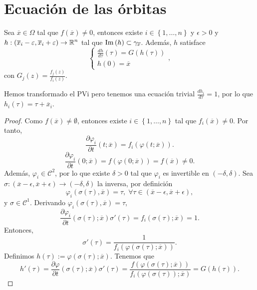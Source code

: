 \section{Ecuación de las órbitas}
\begin{theorem}
	Sea $\displaystyle \overline{x}\in \Omega  $ tal que $\displaystyle f\left(\overline{x}\right)\neq0 $, entonces existe $\displaystyle i \in \left\{ 1, \ldots, n\right\}  $ y $\displaystyle \epsilon > 0 $ y $\displaystyle h : \left(\overline{x}_{i}-\varepsilon, \overline{x}_{i}+\varepsilon \right)\to \mathbb{R}^{n} $ tal que $\displaystyle \operatorname{Im}\left(h\right)\subset \gamma_{\overline{x}} $. Además, $\displaystyle h $ satisface
	\[
	\begin{cases}
	\frac{dh}{d\tau}\left(\tau\right)=G\left(h\left(\tau\right)\right)\\
	h\left(0\right)=\overline{x}
	\end{cases}
	,\]
	con $\displaystyle G_{j}\left(z\right)=\frac{f_{j}\left(z\right)}{f_{i}\left(z\right)} $. 
\end{theorem}
\begin{observation}
Hemos transformado el PVi pero tenemos una ecuación trivial $\displaystyle \frac{dh_{i}}{d\tau }= 1 $, por lo que $\displaystyle h_{i}\left(\tau\right)=\tau + \overline{x}_{i} $. 
\end{observation}
\begin{proof}
	Como $\displaystyle f\left(\overline{x}\right)\neq \emptyset $, entonces existe $\displaystyle i \in \left\{ 1, \ldots, n\right\}  $ tal que $\displaystyle f_{i}\left(\overline{x}\right)\neq 0 $. Por tanto, 
	\[\frac{\partial \varphi_{i}}{\partial t}\left(t; \overline{x}\right)=f_{i}\left(\varphi\left(t; \overline{x}\right)\right) .\]
	\[\frac{\partial \varphi_{i}}{\partial t}\left(0; \overline{x}\right)=f\left(\varphi\left(0; \overline{x}\right)\right)=f\left(\overline{x}\right)\neq 0 .\]
	Además, $\displaystyle \varphi_{i}\in \mathcal{C}^{2} $, por lo que existe $\displaystyle \delta > 0 $ tal que $\displaystyle \varphi_{i} $ es invertible en $\displaystyle \left(-\delta, \delta \right) $. Sea $\displaystyle \sigma : \left(\overline{x}-\epsilon , \overline{x}+\epsilon \right)\to \left(-\delta, \delta \right) $ la inversa, por definición
	\[\varphi_{i}\left(\sigma\left(\tau\right), \overline{x}\right)=\tau , \; \forall \tau \in \left(\overline{x}-\epsilon, \overline{x}+\epsilon \right),\]
	y $\displaystyle \sigma \in \mathcal{C}^{1} $. Derivando $\displaystyle \varphi_{i}\left(\sigma\left(\tau\right), \overline{x}\right)=\tau $, 
	\[\frac{\partial \varphi_{i}}{\partial t}\left(\sigma\left(\tau\right); \overline{x}\right)\sigma'\left(\tau \right)=f_{i}\left(\sigma\left(\tau\right); \overline{x}\right)=1 .\]
	Entonces, 
	\[\sigma'\left(\tau \right)=\frac{1}{f_{i}\left(\varphi\left(\sigma\left(\tau\right); \overline{x}\right)\right)} .\]
	Definimos $\displaystyle h\left(\tau\right):=\varphi\left(\sigma\left(\tau\right); \overline{x}\right) $. Tenemos que 
	\[h'\left(\tau\right)=\frac{\partial\varphi}{\partial t}\left(\sigma\left(\tau\right); \overline{x}\right)\sigma'\left(\tau\right) = \frac{f\left(\varphi\left(\sigma \left(\tau\right); \overline{x}\right)\right)}{f_{i}\left(\varphi\left(\sigma\left(\tau\right)\right); \overline{x}\right)}=G\left(h\left(\tau\right)\right) .\]	
\end{proof}

